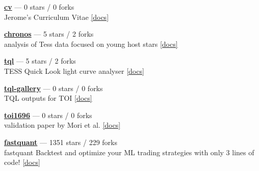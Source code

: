 \item \href{https://github.com/jpdeleon/cv}{{\bf cv}} --- 0 stars / 0 forks \\
Jerome's Curriculum Vitae \href{https://raw.githubusercontent.com/jpdeleon/cv/main-pdf/tex/cv_pubs.pdf}{[docs]}

\item \href{https://github.com/jpdeleon/chronos}{{\bf chronos}} --- 5 stars / 2 forks \\
analysis of Tess data focused on young host stars \href{None}{[docs]}

\item \href{https://github.com/jpdeleon/tql}{{\bf tql}} --- 5 stars / 2 forks \\
TESS Quick Look light curve analyser \href{None}{[docs]}

\item \href{https://github.com/jpdeleon/tql-gallery}{{\bf tql-gallery}} --- 0 stars / 0 forks \\
TQL outputs for TOI \href{None}{[docs]}

\item \href{https://github.com/jpdeleon/toi1696}{{\bf toi1696}} --- 0 stars / 0 forks \\
validation paper by Mori et al. \href{None}{[docs]}

\item \href{https://github.com/enzoampil/fastquant}{{\bf fastquant}} --- 1351 stars / 229 forks \\
fastquant {\textemdash} Backtest and optimize your ML trading strategies with only 3 lines of code! \href{}{[docs]}